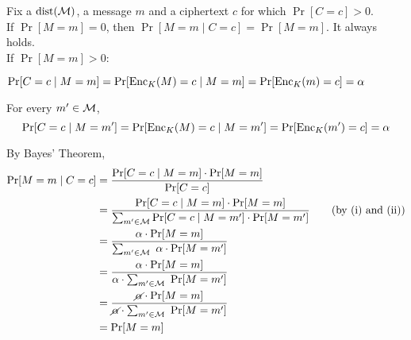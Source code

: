 \begin{myProof}
	Fix a \(\operatorname{dist}(\operatorname{\mathcal{M}})\), a message \(m\) and a ciphertext \(c\) for which \(\Pr[C = c] > 0\). \\
	If \(\Pr[M = m] = 0\), then \(\Pr[M = m \mid C = c] = \Pr[M = m]\). It always holds. \\
	If \(\Pr[M = m] > 0\):
	\begin{myEnumerate}[label=(\roman*)]
		\item \( \Pr[C = c \mid M = m] = \Pr[\operatorname{Enc}_K(M) = c \mid M = m] = \Pr[\operatorname{Enc}_K(m) = c] = \mathbf{\alpha} \)
		
		\item For every \(m' \in \operatorname{\mathcal{M}}\),
		\[ \Pr[C = c \mid M = m'] = \Pr[\operatorname{Enc}_K(M) = c \mid M = m'] = \Pr[\operatorname{Enc}_K(m') = c] = \mathbf{\alpha} \]
		
		\item By Bayes' Theorem, 
		\begingroup
		\addtolength{\jot}{1em}
		\begin{align*}
			\Pr[M = m \mid C = c]
					&= \frac{\Pr[C = c \mid M = m] \cdot \Pr[M = m]}{\Pr[C = c]} \\
					&= \frac{\Pr[C = c \mid M = m] \cdot \Pr[M = m]}{\sum_{m' \in \operatorname{\mathcal{M}}} \Pr[C = c \mid M = m'] \cdot \Pr[M = m']} \tag{by (i) and (ii)}\\
					& = \frac{\alpha \cdot \Pr[M = m]}{\sum_{m' \in \operatorname{\mathcal{M}}} \ \alpha \cdot \Pr[M = m']} \\
					& = \frac{\alpha \cdot \Pr[M = m]}{\alpha \cdot \sum_{m' \in \operatorname{\mathcal{M}}} \ \Pr[M = m']} \\
					& = \frac{\cancel\alpha \cdot \Pr[M = m]}{\cancel\alpha \cdot \sum_{m' \in \operatorname{\mathcal{M}}} \ \Pr[M = m']} \\
					& = \Pr[M = m]
		\end{align*}
		\endgroup
	\end{myEnumerate}
\end{myProof}

\pagebreak

